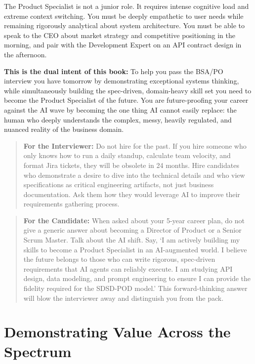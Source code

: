 The Product Specialist is not a junior role. It requires intense
cognitive load and extreme context switching. You must be deeply
empathetic to user needs while remaining rigorously analytical about
system architecture. You must be able to speak to the CEO about market
strategy and competitive positioning in the morning, and pair with the
Development Expert on an API contract design in the afternoon.

\textbf{This is the dual intent of this book:} To help you pass the
BSA/PO interview you have tomorrow by demonstrating exceptional systems
thinking, while simultaneously building the spec-driven, domain-heavy
skill set you need to become the Product Specialist of the future. You
are future-proofing your career against the AI wave by becoming the one
thing AI cannot easily replace: the human who deeply understands the
complex, messy, heavily regulated, and nuanced reality of the business
domain.

\begin{quote}
\textbf{For the Interviewer:} Do not hire for the past. If you hire
someone who only knows how to run a daily standup, calculate team
velocity, and format Jira tickets, they will be obsolete in 24 months.
Hire candidates who demonstrate a desire to dive into the technical
details and who view specifications as critical engineering artifacts,
not just business documentation. Ask them how they would leverage AI to
improve their requirements gathering process.
\end{quote}

\begin{quote}
\textbf{For the Candidate:} When asked about your 5-year career plan, do
not give a generic answer about becoming a Director of Product or a
Senior Scrum Master. Talk about the AI shift. Say, `I am actively
building my skills to become a Product Specialist in an AI-augmented
world. I believe the future belongs to those who can write rigorous,
spec-driven requirements that AI agents can reliably execute. I am
studying API design, data modeling, and prompt engineering to ensure I
can provide the fidelity required for the SDSD-POD model.' This
forward-thinking answer will blow the interviewer away and distinguish
you from the pack.
\end{quote}

\section{Demonstrating Value Across the
Spectrum}\label{demonstrating-value-across-the-spectrum}

